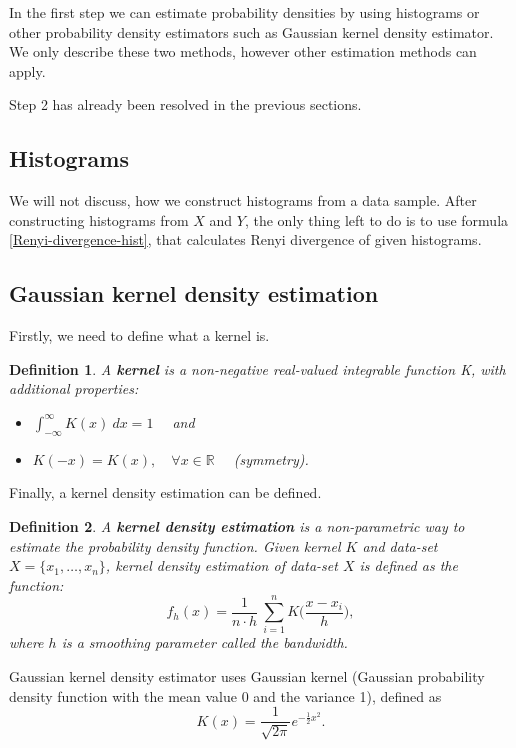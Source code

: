 \documentclass[a4paper, 12pt]{article}
\newtheorem{definition}{Definition}[section]
\theoremstyle{definition}
\begin{document}
In the first step we can estimate probability densities by using histograms or other probability density estimators such as Gaussian kernel density estimator. We only describe these two methods, however other estimation methods can apply.

Step 2 has already been resolved in the previous sections.

\subsection*{Histograms}

We will not discuss, how we construct histograms from a data sample. After constructing histograms from $X$ and $Y$, the only thing left to do is to use formula \eqref{Renyi-divergence-hist}, that calculates Renyi divergence of given histograms.

\subsection*{Gaussian kernel density estimation}

Firstly, we need to define what a kernel is.
\begin{definition}
	A \textbf{kernel} is a non-negative real-valued integrable function K, with additional properties:
	\begin{itemize}
		\item $\int_{-\infty}^\infty K(x) \  dx = 1 \quad$ and
		\item $K(-x) = K(x), \quad \forall x \in \mathbb{R} \quad$ (symmetry).
	\end{itemize}
\end{definition}

Finally, a kernel density estimation can be defined.
\begin{definition}
	A \textbf{kernel density estimation} is a non-parametric way to estimate the probability density function. Given kernel $K$ and data-set $X = \{x_1,\ldots,x_n\}$, kernel density estimation of data-set $X$ is defined as the function:
	\begin{equation}
		f_h(x) = \frac{1}{n\cdot h} \  \sum_{i=1}^n K\Big(\frac{x - x_i}{h}\Big),
	\end{equation}
	where $h$ is a smoothing parameter called the bandwidth.
\end{definition}

Gaussian kernel density estimator uses Gaussian kernel (Gaussian probability density function with the mean value 0 and the variance 1), defined as
\begin{equation}
	K(x) = \frac{1}{\sqrt{2\pi}}e^{-\frac{1}{2}x^2}.
\end{equation}
\end{document}
